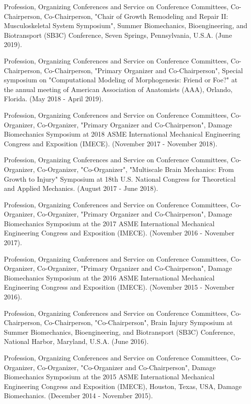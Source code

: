 \documentclass[
]{article}
\begin{document}
Profession, Organizing Conferences and Service on Conference Committees,
Co-Chairperson, Co-Chairperson, "Chair of Growth Remodeling and Repair
II: Musculoskeletal System Symposium", Summer Biomechanics,
Bioengineering, and Biotransport (SB3C) Conference, Seven Springs,
Pennsylvania, U.S.A. (June 2019).

Profession, Organizing Conferences and Service on Conference Committees,
Co-Chairperson, Co-Chairperson, "Primary Organizer and Co-Chairperson",
Special symposium on "Computational Modeling of Morphogenesis: Friend or
Foe?" at the annual meeting of American Association of Anatomists (AAA),
Orlando, Florida. (May 2018 - April 2019).

Profession, Organizing Conferences and Service on Conference Committees,
Co-Organizer, Co-Organizer, "Primary Organizer and Co-Chairperson",
Damage Biomechanics Symposium at 2018 ASME International Mechanical
Engineering Congress and Exposition (IMECE). (November 2017 - November
2018).

Profession, Organizing Conferences and Service on Conference Committees,
Co-Organizer, Co-Organizer, "Co-Organizer", "Multiscale Brain Mechanics:
From Growth to Injury" Symposium at 18th U.S. National Congress for
Theoretical and Applied Mechanics. (August 2017 - June 2018).

Profession, Organizing Conferences and Service on Conference Committees,
Co-Organizer, Co-Organizer, "Primary Organizer and Co-Chairperson",
Damage Biomechanics Symposium at the 2017 ASME International Mechanical
Engineering Congress and Exposition (IMECE). (November 2016 - November
2017).

Profession, Organizing Conferences and Service on Conference Committees,
Co-Organizer, Co-Organizer, "Primary Organizer and Co-Chairperson",
Damage Biomechanics Symposium at the 2016 ASME International Mechanical
Engineering Congress and Exposition (IMECE). (November 2015 - November
2016).

Profession, Organizing Conferences and Service on Conference Committees,
Co-Chairperson, Co-Chairperson, "Co-Chairperson", Brain Injury Symposium
at Summer Biomechanics, Bioengineering, and Biotransport (SB3C)
Conference, National Harbor, Maryland, U.S.A. (June 2016).

Profession, Organizing Conferences and Service on Conference Committees,
Co-Organizer, Co-Organizer, "Co-Organizer and Co-Chairperson", Damage
Biomechanics Symposium at the 2015 ASME International Mechanical
Engineering Congress and Exposition (IMECE), Houston, Texas, USA, Damage
Biomechanics. (December 2014 - November 2015).
\end{document}
